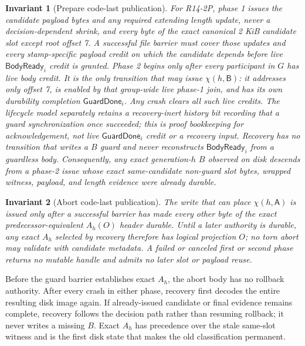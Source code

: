 \documentclass[10pt,twocolumn]{article}
\newtheorem{invariant}{Invariant}
\theoremstyle{remark}
\newcommand{\Prepared}{\mathsf{B}}
\newcommand{\Abort}{\mathsf{A}}
\begin{document}
\begin{invariant}[Prepare code-last publication]\label{i:prepareorder}
For R14-2P, phase 1 issues the candidate payload bytes and any required extending length update,
never a decision-dependent shrink, and every byte of
the exact canonical 2 KiB candidate slot except root offset 7. A successful file barrier must cover
those updates and every stamp-specific payload credit on which the candidate depends before live
$\mathsf{BodyReady}_i$ credit is granted. Phase 2 begins only after every participant in $G$ has
live body credit. It is the only transition that may issue $\chi(h,\Prepared)$: it addresses only
offset 7, is enabled by that group-wide live phase-1 join, and has its own durability completion
$\mathsf{GuardDone}_i$. Any crash clears all such live credits. The lifecycle model separately
retains a recovery-inert history bit recording that a guard synchronization once succeeded; this is
proof bookkeeping for acknowledgement, not live $\mathsf{GuardDone}_i$ credit or a recovery input. Recovery has
no transition that writes a $B$ guard and never reconstructs $\mathsf{BodyReady}_i$ from a
guardless body. Consequently, any exact generation-$h$ $B$ observed on disk descends from a
phase-2 issue whose exact same-candidate non-guard slot bytes, wrapped witness, payload, and length
evidence were already durable.
\end{invariant}

\begin{invariant}[Abort code-last publication]\label{i:abortorder}
The write that can place $\chi(h,\Abort)$ is issued only after a successful barrier has made every
other byte of the exact predecessor-equivalent $A_h(O)$ header durable. Until a later authority is
durable, any exact $A_h$ selected by recovery therefore has logical projection $O$; no torn abort
may validate with candidate metadata. A failed or canceled first or second phase returns no mutable
handle and admits no later slot or payload reuse.
\end{invariant}

Before the guard barrier establishes exact $A_h$, the abort body has no rollback authority. After
every crash in either phase, recovery first decodes the entire resulting disk image again. If
already-issued candidate or final evidence remains complete, recovery follows the decision path
rather than resuming rollback; it never writes a missing $B$. Exact $A_h$ has precedence over the stale same-slot witness and is the first
disk state that makes the old classification permanent.
\end{document}
